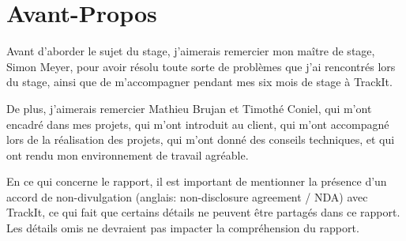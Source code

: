 
\section*{Avant-Propos}

\begin{flushleft}
  Avant d'aborder le sujet du stage, j'aimerais
  remercier mon maître de stage, Simon Meyer, pour
  avoir résolu toute sorte de problèmes que j'ai
  rencontrés lors du stage, ainsi que de m'accompagner
  pendant mes six mois de stage à TrackIt.

  De plus, j'aimerais remercier Mathieu Brujan et
  Timothé Coniel, qui m'ont encadré dans mes projets,
  qui m'ont introduit au client, qui m'ont accompagné
  lors de la réalisation des projets, qui m'ont donné
  des conseils techniques, et qui ont rendu mon
  environnement de travail agréable.
\end{flushleft}

\begin{flushleft}
  En ce qui concerne le rapport, il est important de
  mentionner la présence d'un accord de non-divulgation
  (anglais: non-disclosure agreement / NDA) avec TrackIt,
  ce qui fait que certains détails ne peuvent être partagés
  dans ce rapport. Les détails omis ne devraient pas
  impacter la compréhension du rapport.
\end{flushleft}
